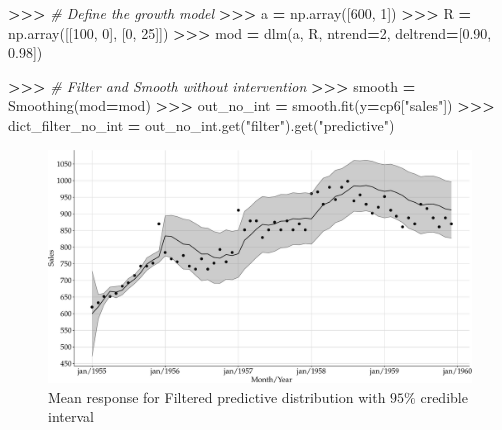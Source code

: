 \documentclass[
]{article}
\newenvironment{Shaded}{\begin{snugshade}}{\end{snugshade}}
\newcommand{\CommentTok}[1]{\textcolor[rgb]{0.56,0.35,0.01}{\textit{#1}}}
\newcommand{\DecValTok}[1]{\textcolor[rgb]{0.00,0.00,0.81}{#1}}
\newcommand{\FloatTok}[1]{\textcolor[rgb]{0.00,0.00,0.81}{#1}}
\newcommand{\NormalTok}[1]{#1}
\newcommand{\OperatorTok}[1]{\textcolor[rgb]{0.81,0.36,0.00}{\textbf{#1}}}
\newcommand{\StringTok}[1]{\textcolor[rgb]{0.31,0.60,0.02}{#1}}
\begin{document}
\begin{Shaded}
\begin{Highlighting}[]
\OperatorTok{\textgreater{}\textgreater{}\textgreater{}} \CommentTok{\# Define the growth model}
\OperatorTok{\textgreater{}\textgreater{}\textgreater{}}\NormalTok{ a }\OperatorTok{=}\NormalTok{ np.array([}\DecValTok{600}\NormalTok{, }\DecValTok{1}\NormalTok{])}
\OperatorTok{\textgreater{}\textgreater{}\textgreater{}}\NormalTok{ R }\OperatorTok{=}\NormalTok{ np.array([[}\DecValTok{100}\NormalTok{, }\DecValTok{0}\NormalTok{], [}\DecValTok{0}\NormalTok{, }\DecValTok{25}\NormalTok{]])}
\OperatorTok{\textgreater{}\textgreater{}\textgreater{}}\NormalTok{ mod }\OperatorTok{=}\NormalTok{ dlm(a, R, ntrend}\OperatorTok{=}\DecValTok{2}\NormalTok{, deltrend}\OperatorTok{=}\NormalTok{[}\FloatTok{0.90}\NormalTok{, }\FloatTok{0.98}\NormalTok{])}
\end{Highlighting}
\end{Shaded}

\begin{Shaded}
\begin{Highlighting}[]
\OperatorTok{\textgreater{}\textgreater{}\textgreater{}} \CommentTok{\# Filter and Smooth without intervention}
\OperatorTok{\textgreater{}\textgreater{}\textgreater{}}\NormalTok{ smooth }\OperatorTok{=}\NormalTok{ Smoothing(mod}\OperatorTok{=}\NormalTok{mod)}
\OperatorTok{\textgreater{}\textgreater{}\textgreater{}}\NormalTok{ out\_no\_int }\OperatorTok{=}\NormalTok{ smooth.fit(y}\OperatorTok{=}\NormalTok{cp6[}\StringTok{"sales"}\NormalTok{])}
\OperatorTok{\textgreater{}\textgreater{}\textgreater{}}\NormalTok{ dict\_filter\_no\_int }\OperatorTok{=}\NormalTok{ out\_no\_int.get(}\StringTok{"filter"}\NormalTok{).get(}\StringTok{"predictive"}\NormalTok{)}
\end{Highlighting}
\end{Shaded}

\begin{figure}

{\centering \includegraphics[width=0.9\linewidth]{pybats_detection_files/figure-latex/plot-fit-cp6-filter-no-intervention-1} 

}

\caption{Mean response for Filtered predictive distribution with $95\%$ credible interval}\label{fig:plot-fit-cp6-filter-no-intervention}
\end{figure}
\end{document}
